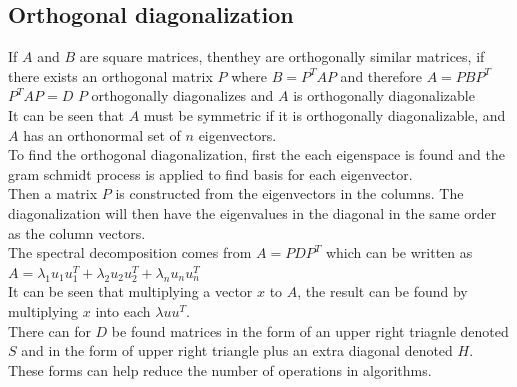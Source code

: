 \documentclass[12pt, a4paper]{article}
\begin{document}
		\subsection{Orthogonal diagonalization}
			If $A$ and $B$ are square matrices, thenthey are  orthogonally similar matrices, if there exists an orthogonal matrix $P$ where $B=P^TAP$ and therefore $A=PBP^T$\\
			$P^TAP=D$ $P$ orthogonally diagonalizes and $A$ is orthogonally diagonalizable\\
			It can be seen that $A$ must be symmetric if it is orthogonally diagonalizable, and $A$ has an orthonormal set of $n$ eigenvectors.\\[4mm]
			To find the orthogonal diagonalization, first the each eigenspace is found and the gram schmidt process is applied to find basis for each eigenvector.\\
			Then a matrix $P$ is constructed from the eigenvectors in the columns. The diagonalization will then have the eigenvalues in the diagonal in the same order as the column vectors.\\[4mm]
			The spectral decomposition comes from $A=PDP^T$ which can be written as $A=\lambda_1u_1u_1^T+\lambda_2u_2u_2^T+\lambda_nu_nu_n^T$\\
			It can be seen that multiplying a vector $x$ to $A$, the result can be found by multiplying $x$ into each $\lambda uu^T$.\\
			There can for $D$ be found matrices in the form of an upper right triagnle denoted $S$ and in the form of upper right triangle plus an extra diagonal denoted $H$.\\
			These forms can help reduce the number of operations in algorithms.
			
			
		
				
\end{document}
